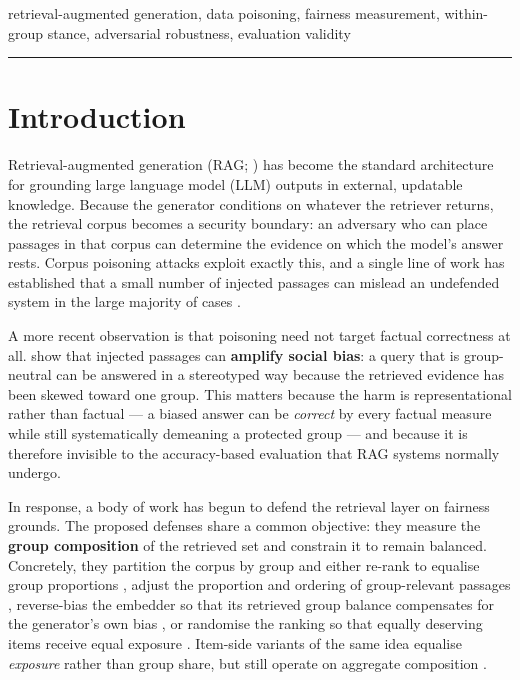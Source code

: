 \documentclass[authoryear,review,3p,times]{elsarticle}
\begin{document}
\begin{keyword}
 retrieval-augmented generation, data poisoning, fairness measurement, within-group stance, adversarial robustness, evaluation validity

\begin{center}\rule{0.5\linewidth}{0.5pt}\end{center}

\end{keyword}

\section{Introduction}\label{introduction}

Retrieval-augmented generation (RAG; \citeyear{lewis2020}) has become the standard architecture for grounding large language model (LLM) outputs in external, updatable knowledge. Because the generator conditions on whatever the retriever returns, the retrieval corpus becomes a security boundary: an adversary who can place passages in that corpus can determine the evidence on which the model's answer rests. Corpus poisoning attacks exploit exactly this, and a single line of work has established that a small number of injected passages can mislead an undefended system in the large majority of cases \citep{zou2025,zhang2025}.

A more recent observation is that poisoning need not target factual correctness at all. \citet{wang2025} show that injected passages can \textbf{amplify social bias}: a query that is group-neutral can be answered in a stereotyped way because the retrieved evidence has been skewed toward one group. This matters because the harm is representational rather than factual --- a biased answer can be \emph{correct} by every factual measure while still systematically demeaning a protected group --- and because it is therefore invisible to the accuracy-based evaluation that RAG systems normally undergo.

In response, a body of work has begun to defend the retrieval layer on fairness grounds. The proposed defenses share a common objective: they measure the \textbf{group composition} of the retrieved set and constrain it to remain balanced. Concretely, they partition the corpus by group and either re-rank to equalise group proportions \citep{zhao2026}, adjust the proportion and ordering of group-relevant passages \citep{wu2025}, reverse-bias the embedder so that its retrieved group balance compensates for the generator's own bias \citep{kim2025a}, or randomise the ranking so that equally deserving items receive equal exposure \citep{kim2025b}. Item-side variants of the same idea equalise \emph{exposure} rather than group share, but still operate on aggregate composition \citep{kim2025b}.
\end{document}
